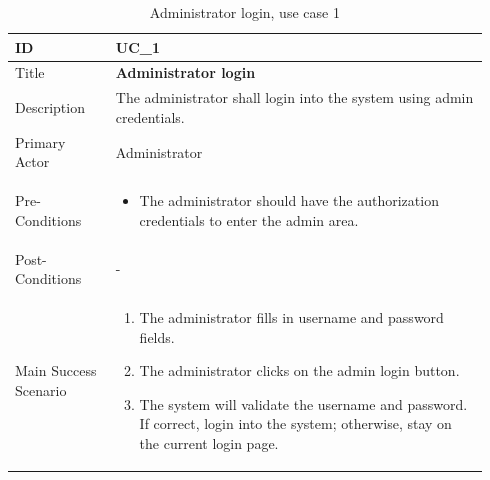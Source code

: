 \documentclass{scrartcl}
\begin{document}
\begin{table}[H]
  \caption{Administrator login, use case 1}
  \begin{tabular}{p{0.20\linewidth} | p{0.74\linewidth}}
    \toprule
    ID & UC\_1
    \\\midrule
    Title & \textbf{Administrator login}
    \\\hline
    Description & The administrator shall login into the system using admin credentials.
    \\\hline
    Primary Actor & Administrator
    \\\hline
    Pre-Conditions & {
                     \begin{itemize}
                     \item The administrator should have the authorization credentials to enter the admin area.
                     \end{itemize}
                     }\vspace*{-\baselineskip}
    \\\hline
    Post-Conditions & -
    \\\hline
    Main Success Scenario & {
                            \begin{enumerate}
                            \item The administrator fills in username and password fields.
                            \item The administrator clicks on the admin login button.
                            \item The system will validate the username and password. If correct, login into the system; otherwise, stay on the current login page.
                            \end{enumerate}
                            }\vspace*{-\baselineskip}
    \\\bottomrule
  \end{tabular}
\end{table}
\end{document}
